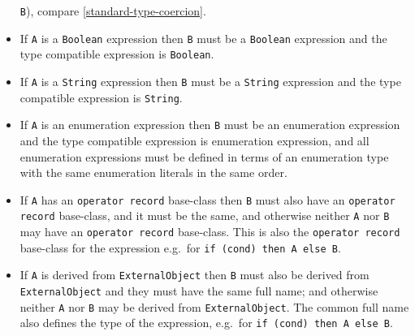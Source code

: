 \begin{itemize}
  \lstinline!B!), compare \autoref{standard-type-coercion}.
\item
  If \lstinline!A! is a \lstinline!Boolean! expression then \lstinline!B! must be a \lstinline!Boolean! expression and
  the type compatible expression is \lstinline!Boolean!.
\item
  If \lstinline!A! is a \lstinline!String! expression then \lstinline!B! must be a \lstinline!String! expression and the
  type compatible expression is \lstinline!String!.
\item
  If \lstinline!A! is an enumeration expression then \lstinline!B! must be an enumeration
  expression and the type compatible expression is enumeration
  expression, and all enumeration expressions must be defined in terms
  of an enumeration type with the same enumeration literals in the same
  order.
\item
  If \lstinline!A! has an \lstinline!operator record! base-class then \lstinline!B! must also have an
  \lstinline!operator record! base-class, and it must be the same, and otherwise
  neither \lstinline!A! nor \lstinline!B! may have an \lstinline!operator record! base-class. This is also
  the \lstinline!operator record! base-class for the expression e.g.\ for
  \lstinline!if (cond) then A else B!.
\item
  If \lstinline!A! is derived from \lstinline!ExternalObject! then \lstinline!B! must also be derived from
  \lstinline!ExternalObject! and they must have the same full name; and otherwise
  neither \lstinline!A! nor \lstinline!B! may be derived from \lstinline!ExternalObject!. The common full
  name also defines the type of the expression, e.g.\ for \lstinline!if (cond) then A else B!.
\end{itemize}
